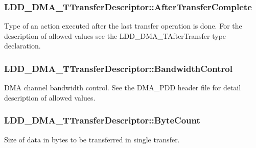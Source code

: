 \subsubsection[{After\+Transfer\+Complete}]{ L\+D\+D\+\_\+\+D\+M\+A\+\_\+\+T\+Transfer\+Descriptor\+::\+After\+Transfer\+Complete}\label{struct_l_d_d___d_m_a___t_transfer_descriptor_ad6046f40169d2ea20061906342615380}
Type of an action executed after the last transfer operation is done. For the description of allowed values see the L\+D\+D\+\_\+\+D\+M\+A\+\_\+\+T\+After\+Transfer type declaration. \hypertarget{struct_l_d_d___d_m_a___t_transfer_descriptor_a163633695c0c3e1a057dffae0e722d16}{}
\subsubsection[{Bandwidth\+Control}]{ L\+D\+D\+\_\+\+D\+M\+A\+\_\+\+T\+Transfer\+Descriptor\+::\+Bandwidth\+Control}\label{struct_l_d_d___d_m_a___t_transfer_descriptor_a163633695c0c3e1a057dffae0e722d16}
D\+M\+A channel bandwidth control. See the D\+M\+A\+\_\+\+P\+D\+D header file for detail description of allowed values. \hypertarget{struct_l_d_d___d_m_a___t_transfer_descriptor_aa02f90cb635b64ab6217e714bcdb1462}{}
\subsubsection[{Byte\+Count}]{ L\+D\+D\+\_\+\+D\+M\+A\+\_\+\+T\+Transfer\+Descriptor\+::\+Byte\+Count}\label{struct_l_d_d___d_m_a___t_transfer_descriptor_aa02f90cb635b64ab6217e714bcdb1462}
Size of data in bytes to be transferred in single transfer. \hypertarget{struct_l_d_d___d_m_a___t_transfer_descriptor_aae81aa421cebab862ae4b8ca9d384318}{}
